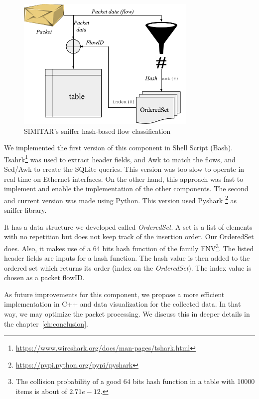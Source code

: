 \begin{figure}[ht!]
        \centering
        \includegraphics[height=2.5in]{figures/ch3/sniffer-classifier}
        \caption{SIMITAR's sniffer hash-based flow classification}
    \label{fig:sniffer}
\end{figure}


We implemented the first version of this component in Shell Script (Bash).  Tsahrk\footnote{\href{https://www.wireshark.org/docs/man-pages/tshark.html}{https://www.wireshark.org/docs/man-pages/tshark.html}} was used to extract header fields, and Awk to match the flows, and Sed/Awk to create the SQLite queries. This version was too slow to operate in real time on Ethernet interfaces. On the other hand, this approach was fast to implement and enable the implementation of the other components. The second and current version was made using Python. This version used Pyshark \footnote{\href{https://pypi.python.org/pypi/pyshark}{https://pypi.python.org/pypi/pyshark}} as sniffer library.  


It has a data structure we developed called \textit{OrderedSet}. A set is a list of elements with no repetition but does not keep track of the insertion order. Our OrderedSet does. Also, it makes use of a  64 bits hash function of the family FNV\footnote{The collision probability of a good 64 bits hash function in a table with 10000 items is about of $2.71e-12$.}. The listed header fields are inputs for a hash function. The hash value is then added to the ordered set which returns its order (index on the \textit{OrderedSet}). The index value is chosen as a packet flowID.  


As future improvements for this component, we propose a more efficient implementation in C++ and data visualization for the collected data. In that way, we may optimize the packet processing. We discuss this in deeper details in the chapter~\ref{ch:conclusion}.


